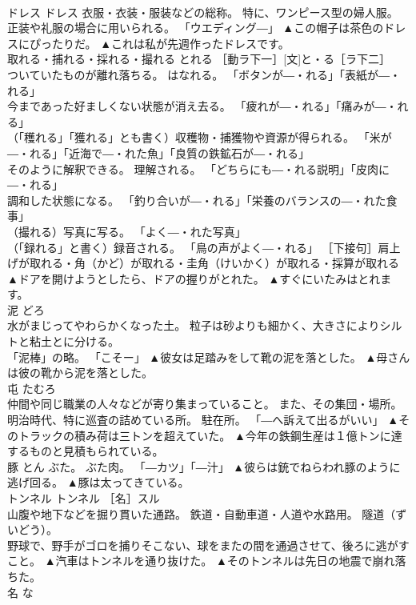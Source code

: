 \documentclass[8pt]{extreport}
\begin{document}
\begin{CJK}{UTF8}{min}
\\	ドレス	ドレス	衣服・衣装・服装などの総称。 特に、ワンピース型の婦人服。 正装や礼服の場合に用いられる。 「ウエディング―」	▲この帽子は茶色のドレスにぴったりだ。 ▲これは私が先週作ったドレスです。
\\	取れる・捕れる・採れる・撮れる	とれる	［動ラ下一］[文]と・る［ラ下二］ 
\\	ついていたものが離れ落ちる。 はなれる。 「ボタンが―・れる」「表紙が―・れる」 
\\	今まであった好ましくない状態が消え去る。 「疲れが―・れる」「痛みが―・れる」 
\\	（「穫れる」「獲れる」とも書く）収穫物・捕獲物や資源が得られる。 「米が―・れる」「近海で―・れた魚」「良質の鉄鉱石が―・れる」 
\\	そのように解釈できる。 理解される。 「どちらにも―・れる説明」「皮肉に―・れる」 
\\	調和した状態になる。 「釣り合いが―・れる」「栄養のバランスの―・れた食事」 
\\	（撮れる）写真に写る。 「よく―・れた写真」 
\\	（「録れる」と書く）録音される。 「鳥の声がよく―・れる」 ［下接句］肩上げが取れる・角（かど）が取れる・圭角（けいかく）が取れる・採算が取れる	▲ドアを開けようとしたら、ドアの握りがとれた。 ▲すぐにいたみはとれます。
\\	泥	どろ	
\\	水がまじってやわらかくなった土。 粒子は砂よりも細かく、大きさによりシルトと粘土とに分ける。 
\\	「泥棒」の略。 「こそー」	▲彼女は足踏みをして靴の泥を落とした。 ▲母さんは彼の靴から泥を落とした。
\\	屯	たむろ	
\\	仲間や同じ職業の人々などが寄り集まっていること。 また、その集団・場所。 
\\	明治時代、特に巡査の詰めている所。 駐在所。 「―へ訴えて出るがいい」	▲そのトラックの積み荷は三トンを超えていた。 ▲今年の鉄鋼生産は１億トンに達するものと見積もられている。
\\	豚	とん	ぶた。 ぶた肉。 「―カツ」「―汁」	▲彼らは銃でねらわれ豚のように逃げ回る。 ▲豚は太ってきている。
\\	トンネル	トンネル	［名］スル 
\\	山腹や地下などを掘り貫いた通路。 鉄道・自動車道・人道や水路用。 隧道（ずいどう）。 
\\	野球で、野手がゴロを捕りそこない、球をまたの間を通過させて、後ろに逃がすこと。	▲汽車はトンネルを通り抜けた。 ▲そのトンネルは先日の地震で崩れ落ちた。
\\	名	な	

\end{CJK}
\end{document}
